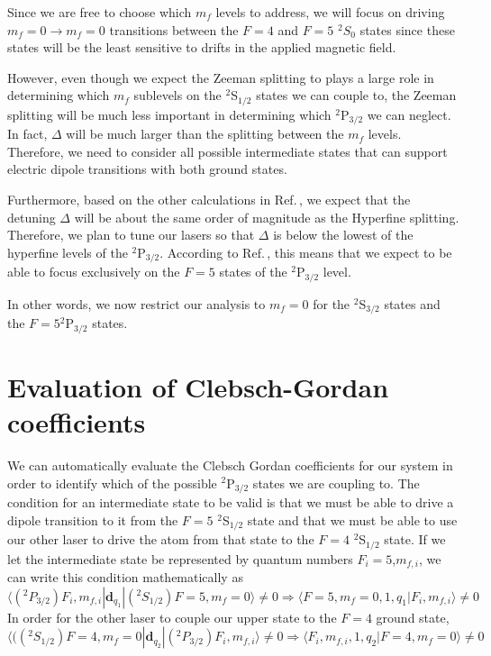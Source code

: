 Since we are free to choose which $m_f$ levels to address, we will focus on driving $m_f=0\rightarrow m_f=0$ transitions between the $F=4$ and $F=5$ $^2 S_{0}$ states since these states will be the least sensitive to drifts in the applied magnetic field. 

However, even though we expect the Zeeman splitting to plays a large role in determining which $m_f$ sublevels on the $^2$S$_{1/2}$ states we can couple to, the Zeeman splitting will be much less important in determining which $^2$P$_{3/2}$ we can neglect. In fact, $\Delta$ will be much larger than the splitting between the $m_f$ levels. Therefore, we need to consider all possible intermediate states that can support electric dipole transitions with both ground states. %


Furthermore, based on the other calculations in Ref.\,\cite{cjeDiss}, we expect that the detuning $\Delta$ will be about the same order of magnitude as the Hyperfine splitting. Therefore, we plan to tune our lasers so that $\Delta$ is below the lowest of the hyperfine levels of the $^2$P$_{3/2}$. According to Ref.\,\cite{tableOfHyperfine deetuings}, this means that we expect to be able to focus exclusively on the $F=5$ states of the $^2$P$_{3/2}$ level.

In other words, we now restrict our analysis to $m_f=0$ for the $^2$S$_{3/2}$ states and the $F=5$$^2$P$_{3/2}$ states.

\section{Evaluation of Clebsch-Gordan coefficients}

We can automatically evaluate the Clebsch Gordan coefficients for our system in order to identify which of the possible $^2$P$_{3/2}$ states we are coupling to. The condition for an intermediate state to be valid is that we must be able to drive a dipole transition to it from the $F=5$ $^2$S$_{1/2}$ state and that we must be able to use our other laser to drive the atom from that state to the $F=4$ $^2$S$_{1/2}$ state. If we let the intermediate state be represented by quantum numbers $F_i=5$,$m_{f,i}$, we can write this condition mathematically as  
\begin{equation}
\langle (^2P_{3/2}) F_i,m_{f,i}|\mathbf{d}_{q_1}|(^2S_{1/2})F=5,m_f=0\rangle\neq 0 \Rightarrow \langle F=5,m_f=0,1,q_1|F_i,m_{f,i}\rangle \neq 0  \label{thing1}
\end{equation}
In order for the other laser to couple our upper state to the $F=4$ ground state, 
\begin{equation}
\langle ((^2S_{1/2})F=4,m_f=0|\mathbf{d}_{q_2}|(^2P_{3/2}) F_i,m_{f,i}\rangle\neq 0 \Rightarrow \langle F_i,m_{f,i},1,q_2|F=4,m_f=0 \rangle \neq 0 \label{thing2}
\end{equation}


